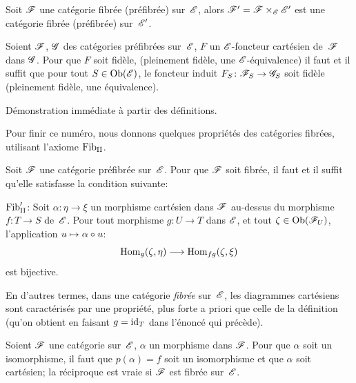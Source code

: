 \begin{corollaire}
\label{VI.6.9}
Soit $\cal{F}$ une cat\'egorie fibr\'ee (\resp pr\'efibr\'ee)
sur~$\cal{E}$, alors $\cal{F}'=\cal{F}\times_{\cal{E}}\cal{E}'$ est
une cat\'egorie fibr\'ee (\resp pr\'efibr\'ee) sur~$\cal{E}'$.
\end{corollaire}

\begin{proposition}
\label{VI.6.10} Soient $\cal{F}$, $\cal{G}$ des cat\'egories
pr\'efibr\'ees sur~$\cal{E}$, $F$ un $\cal{E}$-foncteur
cart\'esien de~$\cal{F}$ dans $\cal{G}$. Pour que $F$ soit
fid\`ele,
(\resp pleinement fid\`ele, \resp une $\cal{E}$-\'equivalence)
il faut et il suffit que pour tout
$S\in \Ob(\cal{E})$,
le foncteur induit $F_S\colon \cal{F}_S\to \cal{G}_S$ soit
fid\`ele (\resp pleinement fid\`ele, \resp une \'equivalence).
\end{proposition}

D\'emonstration imm\'ediate \`a partir des d\'efinitions.

Pour finir ce num\'ero, nous donnons quelques propri\'et\'es des
cat\'egories fibr\'ees, utilisant l'axiome $\mathrm{Fib}_{\mathrm{II}}$.
\begin{proposition}
\label{VI.6.11} Soit $\cal{F}$ une cat\'egorie pr\'efibr\'ee
sur~$\cal{E}$. Pour que $\cal{F}$ soit fibr\'ee, il faut et il
suffit qu'elle satisfasse la condition suivante:

$\mathrm{Fib}_{\mathrm{II}}'$: Soit $\alpha\colon\eta\to\xi$ un morphisme
cart\'esien dans $\cal{F}$ au-dessus du morphisme $f\colon T\to S$
de~$\cal{E}$. Pour tout morphisme $g\colon U\to T$ dans $\cal{E}$, et
tout
$\zeta\in\Ob(\cal{F}_U)$,
l'application $u\mto\alpha\circ u$:
$$
\Hom_g(\zeta,\eta)\to\Hom_{fg}(\zeta,\xi)
$$
est bijective.
\end{proposition}

En d'autres termes, dans une cat\'egorie \emph{fibrée}
sur~$\cal{E}$, les diagrammes cart\'esiens sont caract\'eris\'es
par une propri\'et\'e, plus forte a priori que celle de la
d\'efinition (qu'on obtient en faisant $g=\mathrm{id}_T$ dans
l'\'enonc\'e qui pr\'ec\`ede).
\begin{corollaire}
\label{VI.6.12} Soient $\cal{F}$ une cat\'egorie sur~$\cal{E}$,
$\alpha$ un morphisme dans $\cal{F}$. Pour que $\alpha$ soit un
isomorphisme, il faut que $p(\alpha)=f$ soit un isomorphisme et que
$\alpha$ soit cart\'esien; la r\'eciproque est vraie si $\cal{F}$
est fibr\'ee sur~$\cal{E}$.
\end{corollaire}

